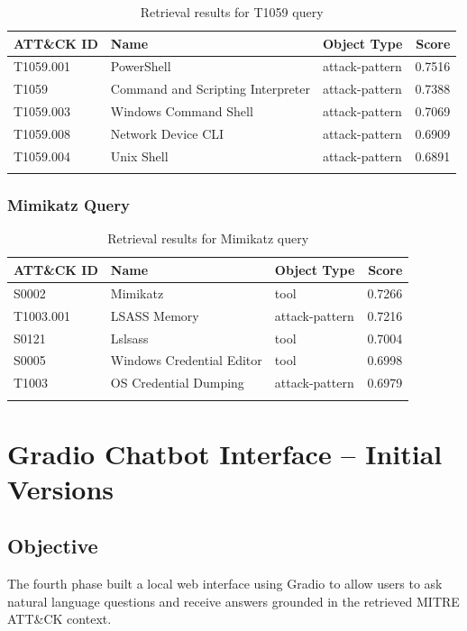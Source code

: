 \documentclass[12pt,a4paper]{report}
\newcommand{\ATTACK}{MITRE ATT\&CK}
\begin{document}
\begin{longtable}{lllr}
\toprule
\textbf{ATT\&CK ID} & \textbf{Name} & \textbf{Object Type} & \textbf{Score} \\
\midrule
\endhead
T1059.001 & PowerShell & attack-pattern & 0.7516 \\
T1059 & Command and Scripting Interpreter & attack-pattern & 0.7388 \\
T1059.003 & Windows Command Shell & attack-pattern & 0.7069 \\
T1059.008 & Network Device CLI & attack-pattern & 0.6909 \\
T1059.004 & Unix Shell & attack-pattern & 0.6891 \\
\bottomrule
\caption{Retrieval results for T1059 query}
\end{longtable}

\subsection{Mimikatz Query}

\begin{longtable}{lllr}
\toprule
\textbf{ATT\&CK ID} & \textbf{Name} & \textbf{Object Type} & \textbf{Score} \\
\midrule
\endhead
S0002 & Mimikatz & tool & 0.7266 \\
T1003.001 & LSASS Memory & attack-pattern & 0.7216 \\
S0121 & Lslsass & tool & 0.7004 \\
S0005 & Windows Credential Editor & tool & 0.6998 \\
T1003 & OS Credential Dumping & attack-pattern & 0.6979 \\
\bottomrule
\caption{Retrieval results for Mimikatz query}
\end{longtable}


\chapter{Gradio Chatbot Interface -- Initial Versions}

\section{Objective}

The fourth phase built a local web interface using Gradio to allow users to ask natural language questions and receive answers grounded in the retrieved \ATTACK{} context.
\end{document}
